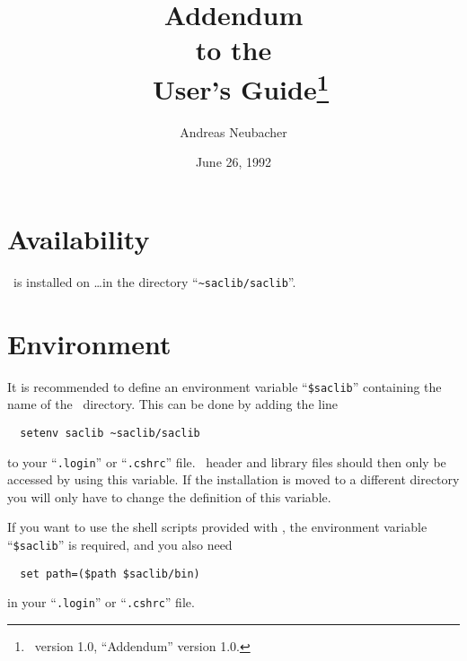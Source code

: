 



\title{
Addendum\\to the\\\saclib\ User's Guide\thanks{
  \saclib\ version 1.0, ``Addendum'' version 1.0.
}
}

\author{Andreas Neubacher}
\date{June 26, 1992}
\maketitle

\section{Availability}

\saclib\ is installed on \ldots in the directory ``{\tt\~{ }saclib/saclib}''.


\section{Environment}

It is recommended to define an environment variable ``{\tt \$saclib}''
containing the name of the \saclib\ directory. This can be done by adding the
line
\begin{verbatim}
  setenv saclib ~saclib/saclib
\end{verbatim}
to your ``{\tt .login}'' or ``{\tt .cshrc}'' file. \saclib\ header and
library files should then only be accessed by using this variable. If the
installation is moved to a different directory you will only have to change
the definition of this variable.

If you want to use the shell scripts provided with \saclib, the environment
variable ``{\tt \$saclib}'' is required, and you also need
\begin{verbatim}
  set path=($path $saclib/bin)
\end{verbatim}
in your ``{\tt .login}'' or ``{\tt .cshrc}'' file.


